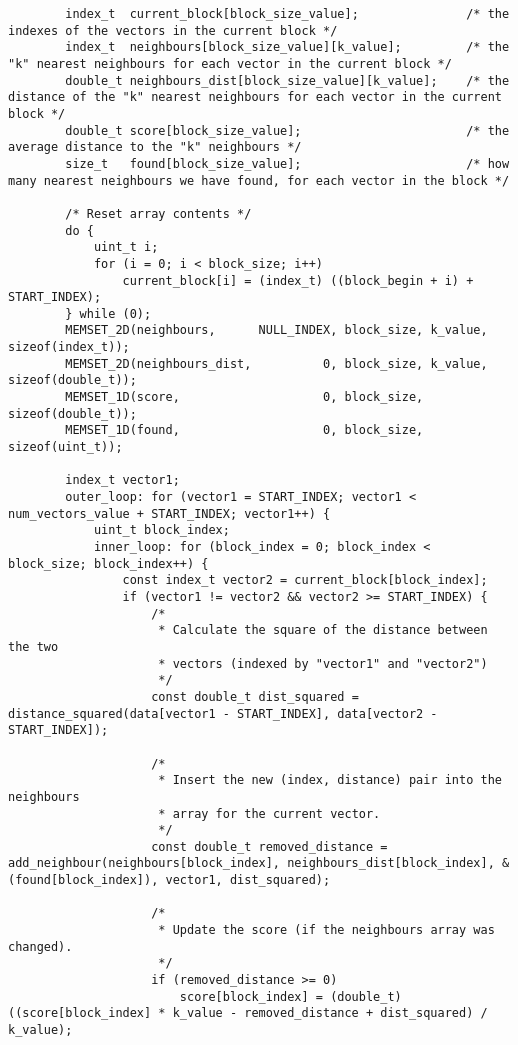 \begin{lstlisting}
        index_t  current_block[block_size_value];               /* the indexes of the vectors in the current block */
        index_t  neighbours[block_size_value][k_value];         /* the "k" nearest neighbours for each vector in the current block */
        double_t neighbours_dist[block_size_value][k_value];    /* the distance of the "k" nearest neighbours for each vector in the current block */
        double_t score[block_size_value];                       /* the average distance to the "k" neighbours */
        size_t   found[block_size_value];                       /* how many nearest neighbours we have found, for each vector in the block */
        
        /* Reset array contents */
        do {
            uint_t i;
            for (i = 0; i < block_size; i++)
                current_block[i] = (index_t) ((block_begin + i) + START_INDEX);
        } while (0);
        MEMSET_2D(neighbours,      NULL_INDEX, block_size, k_value, sizeof(index_t));
        MEMSET_2D(neighbours_dist,          0, block_size, k_value, sizeof(double_t));
        MEMSET_1D(score,                    0, block_size,          sizeof(double_t));
        MEMSET_1D(found,                    0, block_size,          sizeof(uint_t));
        
        index_t vector1;
        outer_loop: for (vector1 = START_INDEX; vector1 < num_vectors_value + START_INDEX; vector1++) {
            uint_t block_index;
            inner_loop: for (block_index = 0; block_index < block_size; block_index++) {
                const index_t vector2 = current_block[block_index];
                if (vector1 != vector2 && vector2 >= START_INDEX) {
                    /*
                     * Calculate the square of the distance between the two
                     * vectors (indexed by "vector1" and "vector2")
                     */
                    const double_t dist_squared = distance_squared(data[vector1 - START_INDEX], data[vector2 - START_INDEX]);
                    
                    /*
                     * Insert the new (index, distance) pair into the neighbours
                     * array for the current vector.
                     */
                    const double_t removed_distance = add_neighbour(neighbours[block_index], neighbours_dist[block_index], &(found[block_index]), vector1, dist_squared);
                    
                    /*
                     * Update the score (if the neighbours array was changed).
                     */
                    if (removed_distance >= 0)
                        score[block_index] = (double_t) ((score[block_index] * k_value - removed_distance + dist_squared) / k_value);
                    

\end{lstlisting}
